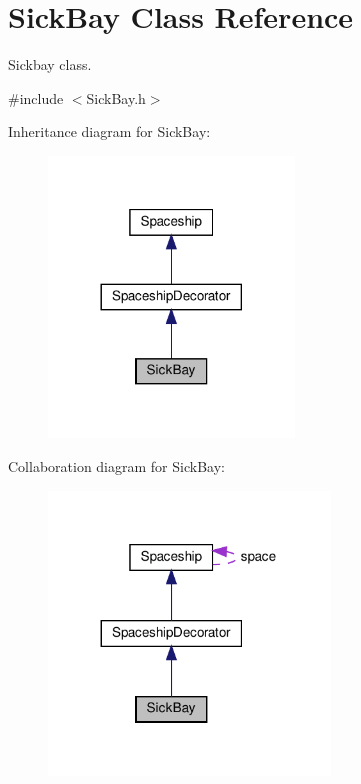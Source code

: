 \hypertarget{classSickBay}{}\section{Sick\+Bay Class Reference}
\label{classSickBay}


Sickbay class.  




{\ttfamily \#include $<$Sick\+Bay.\+h$>$}



Inheritance diagram for Sick\+Bay\+:\nopagebreak
\begin{figure}[H]
\begin{center}
\leavevmode
\includegraphics[width=185pt]{classSickBay__inherit__graph}
\end{center}
\end{figure}


Collaboration diagram for Sick\+Bay\+:\nopagebreak
\begin{figure}[H]
\begin{center}
\leavevmode
\includegraphics[width=212pt]{classSickBay__coll__graph}
\end{center}
\end{figure}
